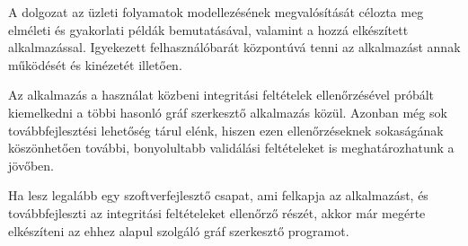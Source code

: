 
A dolgozat az üzleti folyamatok modellezésének megvalósítását célozta meg elméleti és gyakorlati példák bemutatásával, valamint a hozzá elkészített alkalmazással. Igyekezett felhasználóbarát központúvá tenni az alkalmazást annak működését és kinézetét illetően.

Az alkalmazás a használat közbeni integritási feltételek ellenőrzésével próbált kiemelkedni a többi hasonló gráf szerkesztő alkalmazás közül. Azonban még sok továbbfejlesztési lehetőség tárul elénk, hiszen ezen ellenőrzéseknek sokaságának köszönhetően további, bonyolultabb validálási feltételeket is meghatározhatunk a jövőben.

Ha lesz legalább egy szoftverfejlesztő csapat, ami felkapja az alkalmazást, és továbbfejleszti az integritási feltételeket ellenőrző részét, akkor már megérte elkészíteni az ehhez alapul szolgáló gráf szerkesztő programot.